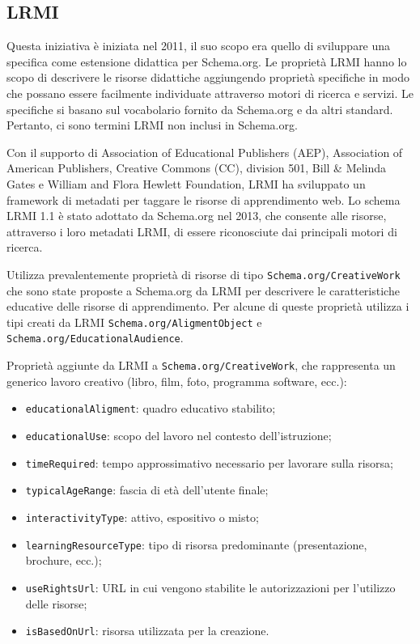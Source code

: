 \subsection{LRMI}
Questa iniziativa è iniziata nel 2011, il suo scopo era quello di sviluppare una specifica come estensione didattica per Schema.org. Le proprietà LRMI hanno lo scopo di descrivere le risorse didattiche aggiungendo proprietà specifiche in modo che possano essere facilmente individuate attraverso motori di ricerca e servizi. Le specifiche si basano sul vocabolario fornito da Schema.org e da altri standard. Pertanto, ci sono termini LRMI non inclusi in Schema.org. 

Con il supporto di Association of Educational Publishers (AEP), Association of American Publishers, Creative Commons (CC), division 501, Bill \& Melinda Gates e William and Flora Hewlett Foundation, LRMI ha sviluppato un framework di metadati per taggare le risorse di apprendimento web. Lo schema LRMI 1.1 è stato adottato da Schema.org nel 2013, che consente alle risorse, attraverso i loro metadati LRMI, di essere riconosciute dai principali motori di ricerca.

Utilizza prevalentemente proprietà di risorse di tipo \texttt{Schema.org/CreativeWork} che sono state proposte a Schema.org da LRMI per descrivere le caratteristiche educative delle risorse di apprendimento. Per alcune di queste proprietà utilizza i tipi creati da LRMI \texttt{Schema.org/AligmentObject} e \texttt{Schema.org/EducationalAudience}.

Proprietà aggiunte da LRMI a \texttt{Schema.org/CreativeWork}, che rappresenta un generico lavoro creativo (libro, film, foto, programma software, ecc.):
\begin{itemize}
\item \texttt{educationalAligment}: quadro educativo stabilito;
\item \texttt{educationalUse}: scopo del lavoro nel contesto dell'istruzione;
\item \texttt{timeRequired}: tempo approssimativo necessario per lavorare sulla risorsa;
\item \texttt{typicalAgeRange}: fascia di età dell'utente finale;
\item \texttt{interactivityType}: attivo, espositivo o misto;
\item \texttt{learningResourceType}: tipo di risorsa predominante (presentazione, brochure, ecc.);
\item \texttt{useRightsUrl}: URL in cui vengono stabilite le autorizzazioni per l'utilizzo delle risorse;
\item \texttt{isBasedOnUrl}: risorsa utilizzata per la creazione.
\end{itemize}

